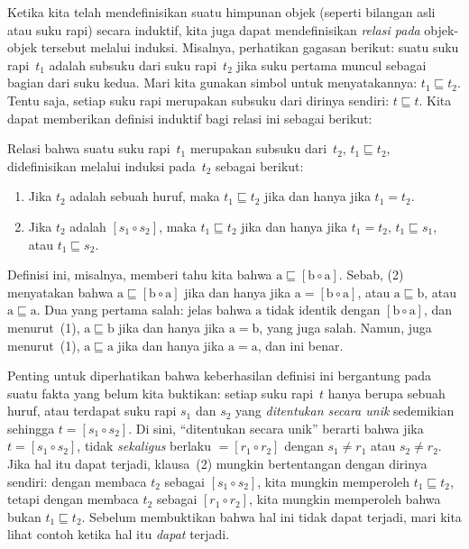 \documentclass[../../../include/open-logic-section]{subfiles}
\begin{document}


Ketika kita telah mendefinisikan suatu himpunan objek (seperti bilangan asli
atau suku rapi) secara induktif, kita juga dapat mendefinisikan
\emph{relasi pada} objek-objek tersebut melalui induksi. Misalnya,
perhatikan gagasan berikut: suatu suku rapi~$t_1$ adalah subsuku dari suku
rapi~$t_2$ jika suku pertama muncul sebagai bagian dari suku kedua. Mari kita gunakan
simbol untuk menyatakannya: $t_1 \sqsubseteq t_2$. Tentu saja, setiap suku
rapi merupakan subsuku dari dirinya sendiri: $t \sqsubseteq t$. Kita dapat
memberikan definisi induktif bagi relasi ini sebagai berikut:

\begin{defn}
  Relasi bahwa suatu suku rapi~$t_1$ merupakan subsuku dari~$t_2$,
  $t_1 \sqsubseteq t_2$, didefinisikan melalui induksi pada~$t_2$ sebagai
  berikut:
  \begin{enumerate}
  \item Jika $t_2$ adalah sebuah huruf, maka $t_1 \sqsubseteq t_2$ jika dan
    hanya jika $t_1 = t_2$.
  \item Jika $t_2$ adalah $[s_1 \circ s_2]$, maka $t_1 \sqsubseteq t_2$
    jika dan hanya jika $t_1 = t_2$, $t_1 \sqsubseteq s_1$, atau
    $t_1 \sqsubseteq s_2$.
  \end{enumerate}
\end{defn}

Definisi ini, misalnya, memberi tahu kita bahwa $\mathrm{a}
\sqsubseteq [\mathrm{b} \circ \mathrm{a}]$. Sebab, (2) menyatakan bahwa
$\mathrm{a} \sqsubseteq [\mathrm{b} \circ \mathrm{a}]$ jika dan hanya jika
$\mathrm{a} = [\mathrm{b} \circ \mathrm{a}]$, atau $\mathrm{a}
\sqsubseteq \mathrm{b}$, atau $\mathrm{a} \sqsubseteq \mathrm{a}$. Dua
yang pertama salah: jelas bahwa $\mathrm{a}$ tidak identik dengan
$[\mathrm{b} \circ \mathrm{a}]$, dan menurut~(1), $\mathrm{a}
\sqsubseteq \mathrm{b}$ jika dan hanya jika $\mathrm{a} = \mathrm{b}$,
yang juga salah. Namun, juga menurut~(1), $\mathrm{a} \sqsubseteq
\mathrm{a}$ jika dan hanya jika $\mathrm{a} = \mathrm{a}$, dan ini benar.

Penting untuk diperhatikan bahwa keberhasilan definisi ini bergantung pada
suatu fakta yang belum kita buktikan: setiap suku rapi~$t$ hanya berupa
sebuah huruf, atau terdapat suku rapi $s_1$ dan $s_2$ yang
\emph{ditentukan secara unik} sedemikian sehingga $t = [s_1 \circ s_2]$.
Di sini, ``ditentukan secara unik'' berarti bahwa jika $t = [s_1 \circ
s_2]$, tidak \emph{sekaligus} berlaku $= [r_1 \circ r_2]$ dengan
$s_1 \neq r_1$ atau $s_2 \neq r_2$. Jika hal itu dapat terjadi,
klausa~(2) mungkin bertentangan dengan dirinya sendiri: dengan membaca
$t_2$ sebagai $[s_1 \circ s_2]$, kita mungkin memperoleh $t_1 \sqsubseteq
t_2$, tetapi dengan membaca $t_2$ sebagai $[r_1 \circ r_2]$, kita mungkin
memperoleh bahwa bukan $t_1 \sqsubseteq t_2$. Sebelum membuktikan bahwa hal
ini tidak dapat terjadi, mari kita lihat contoh ketika hal itu
\emph{dapat} terjadi.
\end{document}
